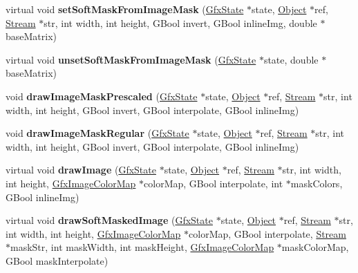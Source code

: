 \begin{DoxyCompactItemize}
\item 
\mbox{\label{class_cairo_output_dev_af9a1a1ad4f9f569113a4dc4136d6dcb9}} 
virtual void {\bfseries set\+Soft\+Mask\+From\+Image\+Mask} (\hyperlink{class_gfx_state}{Gfx\+State} $\ast$state, \hyperlink{class_object}{Object} $\ast$ref, \hyperlink{class_stream}{Stream} $\ast$str, int width, int height, G\+Bool invert, G\+Bool inline\+Img, double $\ast$base\+Matrix)
\item 
\mbox{\label{class_cairo_output_dev_a4328e14b65f40863b28dee6613985e3a}} 
virtual void {\bfseries unset\+Soft\+Mask\+From\+Image\+Mask} (\hyperlink{class_gfx_state}{Gfx\+State} $\ast$state, double $\ast$base\+Matrix)
\item 
\mbox{\label{class_cairo_output_dev_aff8eb94dad2232a90015ccdb21df5bb8}} 
void {\bfseries draw\+Image\+Mask\+Prescaled} (\hyperlink{class_gfx_state}{Gfx\+State} $\ast$state, \hyperlink{class_object}{Object} $\ast$ref, \hyperlink{class_stream}{Stream} $\ast$str, int width, int height, G\+Bool invert, G\+Bool interpolate, G\+Bool inline\+Img)
\item 
\mbox{\label{class_cairo_output_dev_aabcbbe2c23865e0aea1e501dd943937b}} 
void {\bfseries draw\+Image\+Mask\+Regular} (\hyperlink{class_gfx_state}{Gfx\+State} $\ast$state, \hyperlink{class_object}{Object} $\ast$ref, \hyperlink{class_stream}{Stream} $\ast$str, int width, int height, G\+Bool invert, G\+Bool interpolate, G\+Bool inline\+Img)
\item 
\mbox{\label{class_cairo_output_dev_a9b05422ff47a37f32a0ca8569eedc0e0}} 
virtual void {\bfseries draw\+Image} (\hyperlink{class_gfx_state}{Gfx\+State} $\ast$state, \hyperlink{class_object}{Object} $\ast$ref, \hyperlink{class_stream}{Stream} $\ast$str, int width, int height, \hyperlink{class_gfx_image_color_map}{Gfx\+Image\+Color\+Map} $\ast$color\+Map, G\+Bool interpolate, int $\ast$mask\+Colors, G\+Bool inline\+Img)
\item 
\mbox{\label{class_cairo_output_dev_a187f6ddca8d693af97f0c4ce13464ca2}} 
virtual void {\bfseries draw\+Soft\+Masked\+Image} (\hyperlink{class_gfx_state}{Gfx\+State} $\ast$state, \hyperlink{class_object}{Object} $\ast$ref, \hyperlink{class_stream}{Stream} $\ast$str, int width, int height, \hyperlink{class_gfx_image_color_map}{Gfx\+Image\+Color\+Map} $\ast$color\+Map, G\+Bool interpolate, \hyperlink{class_stream}{Stream} $\ast$mask\+Str, int mask\+Width, int mask\+Height, \hyperlink{class_gfx_image_color_map}{Gfx\+Image\+Color\+Map} $\ast$mask\+Color\+Map, G\+Bool mask\+Interpolate)

\end{DoxyCompactItemize}
